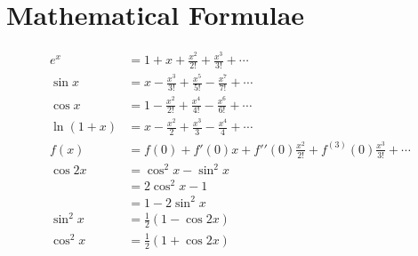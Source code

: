 \documentclass[a4paper,11pt]{slnotes}
\begin{document}

\clearpage

\clearpage

\clearpage

\clearpage


\clearpage
\chapter{Mathematical Formulae}
\begin{align*}
    e^x &= 1 + x + \frac{x^2}{2!} + \frac{x^3}{3!} + \cdots\\
    \sin x &= x - \frac{x^3}{3!} + \frac{x^5}{5!} - \frac{x^7}{7!} + \cdots\\
    \cos x &= 1 - \frac{x^2}{2!} + \frac{x^4}{4!} - \frac{x^6}{6!} + \cdots\\
    \ln(1+x) &= x - \frac{x^2}{2} + \frac{x^3}{3} - \frac{x^4}{4} + \cdots\\
    f(x) &= f(0) + f\prime(0)x + f\prime\prime(0)\frac{x^2}{2!} + f^{(3)}(0)\frac{x^3}{3!} + \cdots\\
    \cos2x &= \cos^2x-\sin^2x\\
    &= 2\cos^2x - 1\\
    &= 1 - 2\sin^2x\\
    \sin^2x &= \frac{1}{2}(1-\cos2x)\\
    \cos^2x &= \frac{1}{2}(1+\cos2x)
\end{align*}
\end{document}
